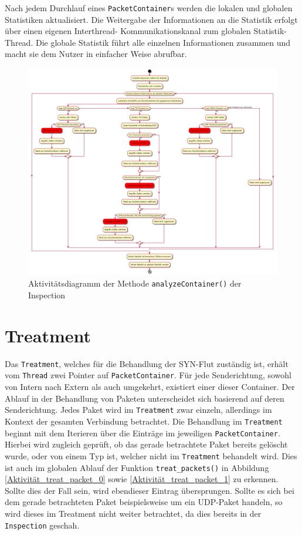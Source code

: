 \documentclass[../review_3.tex]{subfiles}
\begin{document}
Nach jedem Durchlauf eines \texttt{PacketContainer}s werden die lokalen und globalen Statistiken aktualisiert. Die Weitergabe der Informationen an die Statistik erfolgt über einen eigenen Interthread- Kommunikationskanal zum globalen Statistik-Thread. Die globale Statistik führt alle einzelnen Informationen zusammen und macht sie dem Nutzer in einfacher Weise abrufbar.
\begin{figure}[h]
    \centering
    \includegraphics[angle=90, width=\linewidth]{img/inspection_ablauf.png}
    \caption{Aktivitätsdiagramm der Methode \texttt{analyzeContainer()} der Inspection}
    \label{inspection_activity}
\end{figure}

\section{Treatment}
Das \texttt{Treatment}, welches für die Behandlung der SYN-Flut zuständig ist, erhält vom \texttt{Thread} zwei Pointer auf \texttt{PacketContainer}. Für jede Senderichtung, sowohl von Intern nach Extern als auch umgekehrt, existiert einer dieser Container. Der Ablauf in der Behandlung von Paketen unterscheidet sich basierend auf deren Senderichtung. Jedes Paket wird im \texttt{Treatment} zwar einzeln, allerdings im Kontext der gesamten Verbindung betrachtet. Die Behandlung im \texttt{Treatment} beginnt mit dem Iterieren über die Einträge im jeweiligen \texttt{PacketContainer}. Hierbei wird zugleich geprüft, ob das gerade betrachtete Paket bereits gelöscht wurde, oder von einem Typ ist, welcher nicht im \texttt{Treatment} behandelt wird. Dies ist auch im globalen Ablauf der Funktion \texttt{treat\_packets()} in Abbildung \ref{Aktivität_treat_packet_0} sowie \ref{Aktivität_treat_packet_1} zu erkennen. Sollte dies der Fall sein, wird ebendieser Eintrag übersprungen. Sollte es sich bei dem gerade betrachteten Paket beispielsweise um ein UDP-Paket handeln, so wird dieses im Treatment nicht weiter betrachtet, da dies bereits in der \texttt{Inspection} geschah.
\end{document}
